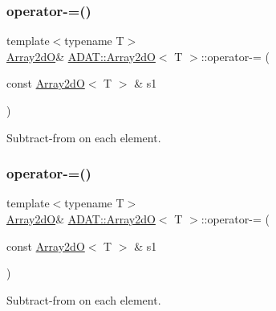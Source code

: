 \subsubsection{\texorpdfstring{operator-\/=()}{operator-=()}\hspace{0.1cm}{\footnotesize\ttfamily [1/6]}}
{\footnotesize\ttfamily template$<$typename T$>$ \\
\mbox{\hyperlink{classADAT_1_1Array2dO}{Array2dO}}\& \mbox{\hyperlink{classADAT_1_1Array2dO}{A\+D\+A\+T\+::\+Array2dO}}$<$ T $>$\+::operator-\/= (\begin{DoxyParamCaption}\item[{const \mbox{\hyperlink{classADAT_1_1Array2dO}{Array2dO}}$<$ T $>$ \&}]{s1 }\end{DoxyParamCaption})\hspace{0.3cm}{\ttfamily [inline]}}



Subtract-\/from on each element. 

\mbox{\label{classADAT_1_1Array2dO_a16fa54fe6c722762ce47b1d9f56b195a}} 
\subsubsection{\texorpdfstring{operator-\/=()}{operator-=()}\hspace{0.1cm}{\footnotesize\ttfamily [2/6]}}
{\footnotesize\ttfamily template$<$typename T$>$ \\
\mbox{\hyperlink{classADAT_1_1Array2dO}{Array2dO}}\& \mbox{\hyperlink{classADAT_1_1Array2dO}{A\+D\+A\+T\+::\+Array2dO}}$<$ T $>$\+::operator-\/= (\begin{DoxyParamCaption}\item[{const \mbox{\hyperlink{classADAT_1_1Array2dO}{Array2dO}}$<$ T $>$ \&}]{s1 }\end{DoxyParamCaption})\hspace{0.3cm}{\ttfamily [inline]}}



Subtract-\/from on each element. 

\mbox{\label{classADAT_1_1Array2dO_a16fa54fe6c722762ce47b1d9f56b195a}} 
